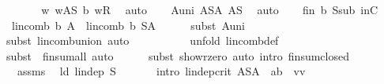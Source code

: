 \begin{isabellebody}
\ \ \isamarkupfalse%
\ {}\ \isamarkupfalse%
\ {}{\isacharcolon}\ {\isachardoublequoteopen}{\isasymAnd}w{\isachardot}\ w{\isasymin}A{\isacharminus}S{\isasymLongrightarrow}\ b\ w{\isacharequal}{\isasymzero}\isactrlbsub R\isactrlesub {\isachardoublequoteclose}\ \isamarkupfalse%
\ auto\isanewline
\ \ \isamarkupfalse%
\ Auni{\isacharcolon}\ {\isachardoublequoteopen}A{\isacharequal}{\isacharparenleft}S{\isasyminter}A{\isacharparenright}\ {\isasymunion}{\isacharparenleft}A{\isacharminus}S{\isacharparenright}{\isachardoublequoteclose}\ \isamarkupfalse%
\ auto\isanewline
\ \ \isamarkupfalse%
\ fin\ b\ Ssub\ inC\ {}\ \isamarkupfalse%
\ {}{\isacharcolon}\ {\isachardoublequoteopen}lincomb\ b\ A\ {\isacharequal}\ lincomb\ b\ {\isacharparenleft}S{\isasyminter}A{\isacharparenright}{\isachardoublequoteclose}\isanewline
\ \ \ \ \isamarkupfalse%
\ {\isacharparenleft}subst\ Auni{\isacharparenright}\ \isanewline
\ \ \ \ \isamarkupfalse%
\ {\isacharparenleft}subst\ lincomb{\isacharunderscore}union{\isacharcomma}\ auto{\isacharparenright}\isanewline
\ \ \ \ \isanewline
\ \ \ \ \isamarkupfalse%
\ {\isacharparenleft}unfold\ lincomb{\isacharunderscore}def{\isacharparenright}\isanewline
\ \ \ \ \isamarkupfalse%
\ {\isacharparenleft}subst\ {\isacharparenleft}{}{\isacharparenright}\ finsum{\isacharunderscore}all{}{\isacharcomma}\ auto{\isacharparenright}\isanewline
\ \ \ \ \isamarkupfalse%
\ {\isacharparenleft}subst\ show{\isacharunderscore}r{\isacharunderscore}zero{\isacharcomma}\ auto\ intro{\isacharbang}{\isacharcolon}\ finsum{\isacharunderscore}closed{\isacharparenright}\isanewline
\ \ \isamarkupfalse%
\ {}\ {}\ assms\ \isamarkupfalse%
\ ld{\isacharcolon}\ {\isachardoublequoteopen}lin{\isacharunderscore}dep\ S{\isachardoublequoteclose}\ \isanewline
\ \ \ \ \isamarkupfalse%
\ {\isacharparenleft}intro\ lin{\isacharunderscore}dep{\isacharunderscore}crit{\isacharbrackleft}\ {\isacharquery}A{\isacharequal}{\isachardoublequoteopen}S{\isasyminter}A{\isachardoublequoteclose}\ \ {\isacharquery}a{\isacharequal}{\isachardoublequoteopen}b{\isachardoublequoteclose}\ \ {\isacharquery}v{\isacharequal}{\isachardoublequoteopen}v{\isachardoublequoteclose}{\isacharbrackright}{\isacharparenright}\isanewline

\end{isabellebody}
